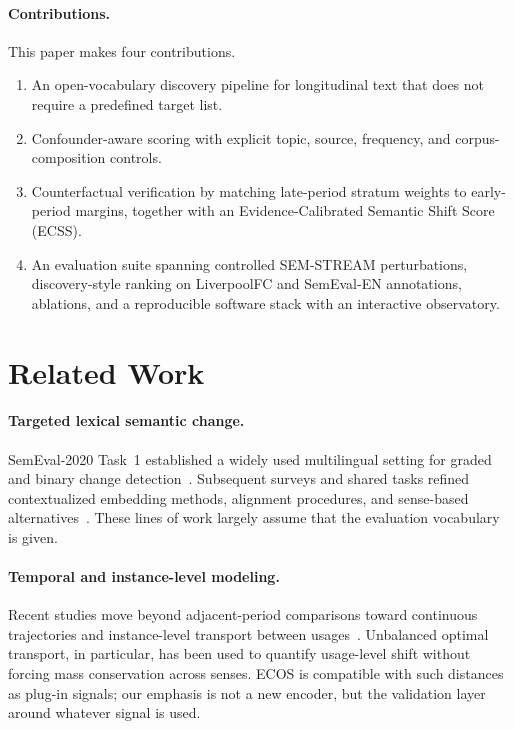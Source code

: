 \documentclass[journal]{IEEEtran}
\begin{document}
\paragraph{Contributions.}
This paper makes four contributions.
\begin{enumerate}
\item An open-vocabulary discovery pipeline for longitudinal text that does not require a predefined target list.
\item Confounder-aware scoring with explicit topic, source, frequency, and corpus-composition controls.
\item Counterfactual verification by matching late-period stratum weights to early-period margins, together with an Evidence-Calibrated Semantic Shift Score (ECSS).
\item An evaluation suite spanning controlled SEM-STREAM perturbations, discovery-style ranking on LiverpoolFC and SemEval-EN annotations, ablations, and a reproducible software stack with an interactive observatory.
\end{enumerate}

\section{Related Work}
\label{sec:related}

\paragraph{Targeted lexical semantic change.}
SemEval-2020 Task~1 established a widely used multilingual setting for graded and binary change detection~\cite{schlechtweg2020semeval}.
Subsequent surveys and shared tasks refined contextualized embedding methods, alignment procedures, and sense-based alternatives~\cite{tahmasebi2021survey,kutuzov2018diachronic}.
These lines of work largely assume that the evaluation vocabulary is given.

\paragraph{Temporal and instance-level modeling.}
Recent studies move beyond adjacent-period comparisons toward continuous trajectories and instance-level transport between usages~\cite{martinc2020capturing,montariol2021scalable}.
Unbalanced optimal transport, in particular, has been used to quantify usage-level shift without forcing mass conservation across senses.
ECOS is compatible with such distances as plug-in signals; our emphasis is not a new encoder, but the validation layer around whatever signal is used.
\end{document}
